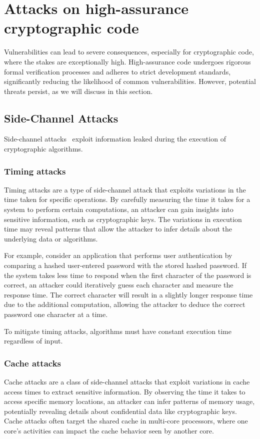 \documentclass[runningheads]{llncs}
\begin{document}
\section{Attacks on high-assurance cryptographic code}

Vulnerabilities can lead to severe consequences, especially for cryptographic code, where the stakes are exceptionally high. High-assurance code undergoes rigorous formal verification processes and adheres to strict development standards, significantly reducing the likelihood of common vulnerabilities. However, potential threats persist, as we will discuss in this section.


\subsection{Side-Channel Attacks}
Side-channel attacks~\cite{paper_side_channel_attacks} exploit information leaked during the execution of cryptographic algorithms.

\subsubsection{Timing attacks}
Timing attacks are a type of side-channel attack that exploits variations in the time taken for specific operations. By carefully measuring the time it takes for a system to perform certain computations, an attacker can gain insights into sensitive information, such as cryptographic keys. The variations in execution time may reveal patterns that allow the attacker to infer details about the underlying data or algorithms.

For example, consider an application that performs user authentication by comparing a hashed user-entered password with the stored hashed password. If the system takes less time to respond when the first character of the password is correct, an attacker could iteratively guess each character and measure the response time. The correct character will result in a slightly longer response time due to the additional computation, allowing the attacker to deduce the correct password one character at a time.

To mitigate timing attacks, algorithms must have constant execution time regardless of input.

\subsubsection{Cache attacks}
Cache attacks are a class of side-channel attacks that exploit variations in cache access times to extract sensitive information. By observing the time it takes to access specific memory locations, an attacker can infer patterns of memory usage, potentially revealing details about confidential data like cryptographic keys. Cache attacks often target the shared cache in multi-core processors, where one core's activities can impact the cache behavior seen by another core.
\end{document}
